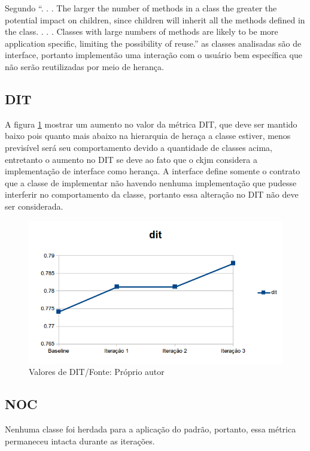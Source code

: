 Segundo  “. . . The larger the number of methods in
a class the greater the potential impact on children, since children will inherit all the
methods defined in the class. . . . Classes with large numbers of methods are likely to
be more application specific, limiting the possibility of reuse.” as classes analisadas
são de interface, portanto implementão uma interação com o usuário bem
específica que não serão reutilizadas por meio de herança.

\subsection{DIT}


A figura \ref{fig:dit} mostrar um aumento no valor da métrica DIT, que deve ser
mantido baixo pois quanto mais abaixo na hierarquia de heraça a classe estiver, menos previsível será seu
comportamento devido a quantidade de classes acima, entretanto o aumento no DIT
se deve ao fato que o ckjm considera a implementação de interface como herança.
A interface define somente o contrato que a classe de implementar não havendo
nenhuma implementação que pudesse interferir no comportamento da classe,
portanto essa alteração no DIT não deve ser considerada.

\begin{figure}[h]
	\centering
	\includegraphics{img/dit.png}
	\caption{Valores de DIT/Fonte: Próprio autor}
	\label{fig:dit}
\end{figure}


\subsection{NOC}

Nenhuma classe foi herdada para a aplicação do padrão, portanto, essa métrica
permaneceu intacta durante as iterações.

